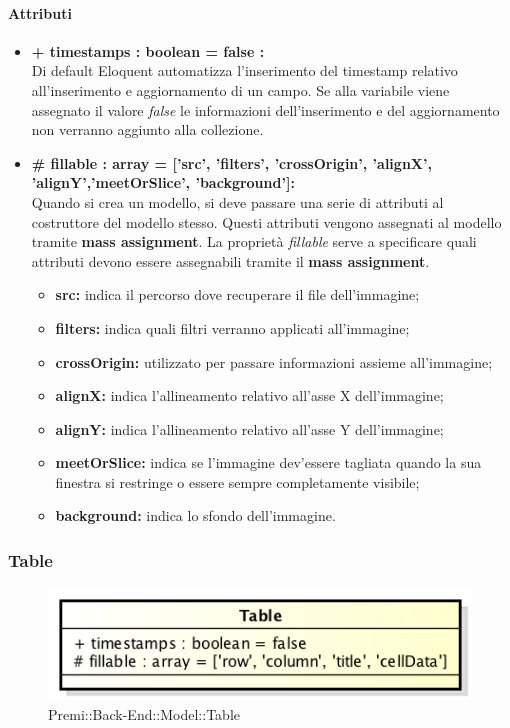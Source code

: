 	\paragraph{Attributi}
	\begin{itemize}
		\item \textbf{+ timestamps : boolean = false :}\\
		Di default Eloquent automatizza l'inserimento del timestamp relativo all'inserimento e aggiornamento di un campo. Se alla variabile viene assegnato il valore \textit{false} le informazioni dell'inserimento e del aggiornamento non verranno aggiunto alla collezione.
		\item \textbf{\# fillable : array = [’src’, ’filters’, ’crossOrigin’, ’alignX’, ’alignY’,’meetOrSlice’, ’background’]:}\\
		Quando si crea un modello, si deve passare una serie di attributi al costruttore del modello stesso. Questi attributi vengono assegnati al modello tramite \textbf{mass assignment}. La proprietà \textit{fillable} serve a specificare quali attributi devono essere assegnabili tramite il \textbf{mass assignment}.
		\begin{itemize}
			\item \textbf{src:} indica il percorso dove recuperare il file dell'immagine;
			\item \textbf{filters:} indica quali filtri verranno applicati all'immagine;
			\item \textbf{crossOrigin:} utilizzato per passare informazioni assieme all'immagine;
			\item \textbf{alignX:} indica l'allineamento relativo all'asse X dell'immagine;
			\item \textbf{alignY:} indica l'allineamento relativo all'asse Y dell'immagine;
			\item \textbf{meetOrSlice:} indica se l'immagine dev'essere tagliata quando la sua finestra si restringe o essere sempre completamente visibile;
			\item \textbf{background:} indica lo sfondo dell'immagine.
		\end{itemize}
	\end{itemize}
\newpage


\subsubsection{Table}

	\begin{figure}[h]
		\centering
		\includegraphics[width=0.5\linewidth]{img/back_end_premi_model_table}
		\caption[Premi::Back-End::Model::Table]{Premi::Back-End::Model::Table}
		\label{fig:back_end_premi_model_table}
	\end{figure}



